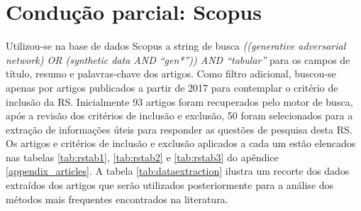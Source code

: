 \section{Condução parcial: Scopus}

Utilizou-se na base de dados Scopus a string de busca \textit{((generative adversarial network) OR (synthetic data AND ``gen*'')) AND ``tabular''} para os campos de título, resumo e palavras-chave dos artigos. Como filtro adicional, buscou-se apenas por artigos publicados a partir de 2017 para contemplar o critério de inclusão da RS. Inicialmente 93 artigos foram recuperados pelo motor de busca, após a revisão dos critérios de inclusão e exclusão, 50 foram selecionados para a extração de informações úteis para responder as questões de pesquisa desta RS. Os artigos e critérios de inclusão e exclusão aplicados a cada um estão elencados nas tabelas \ref{tab:rstab1}, \ref{tab:rstab2} e \ref{tab:rstab3} do apêndice \ref{appendix_articles}. A tabela \ref{tab:dataextraction} ilustra um recorte dos dados extraídos dos artigos que serão utilizados posteriormente para a análise dos métodos mais frequentes encontrados na literatura.

